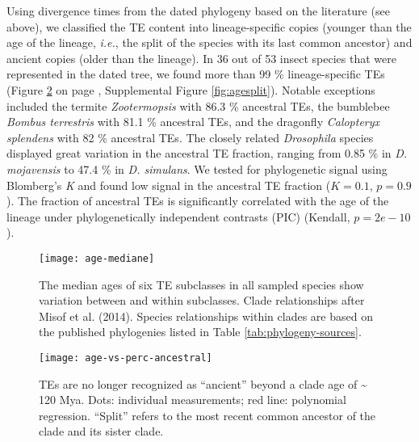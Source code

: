 Using divergence times from the dated phylogeny based on the literature
(see above), we classified the TE content into lineage-specific copies
(younger than the age of the lineage, \emph{i.e.}, the split of the
species with its last common ancestor) and ancient copies (older than
the lineage). In 36 out of 53 insect species that were represented in
the dated tree, we found more than 99 \% lineage-specific TEs (Figure
\ref{fig:age-vs-perc-ancestral} on page
\pageref{fig:age-vs-perc-ancestral},
Supplemental Figure \ref{fig:agesplit}). Notable exceptions included the termite
\emph{Zootermopsis} with 86.3 \% ancestral TEs, the bumblebee
\emph{Bombus terrestris} with 81.1 \% ancestral TEs, and the dragonfly
\emph{Calopteryx splendens} with 82 \% ancestral TEs. The closely
related \emph{Drosophila} species displayed great variation in the
ancestral TE fraction, ranging from 0.85 \% in \emph{D. mojavensis} to
47.4 \% in \emph{D. simulans}. We tested for phylogenetic signal using
Blomberg's \emph{K} and found low signal in the ancestral TE fraction
(\(K = 0.1\), \(p = 0.9\)). The fraction of ancestral TEs
is significantly correlated with the age of the lineage under
phylogenetically independent contrasts (PIC) (Kendall,
\(p = 2e-10\)).

\begin{figure}[h!]
\begin{center}
\texttt{[image: age-mediane]}
\caption[Median ages of transposable elements in arthropods]{{The median ages of six TE subclasses in all sampled species show
variation between and within subclasses. Clade relationships after Misof
et al. (2014). Species relationships within clades are based on the
published phylogenies listed in Table \ref{tab:phylogeny-sources}.
{\label{fig:age-mediane}}%
}}
\end{center}
\end{figure}

\begin{figure}[h!]
\begin{center}
\texttt{[image: age-vs-perc-ancestral]}
\caption[TEs are no longer recognized as ``ancient'' beyond a clade age of
\textasciitilde{} 120 Mya]{{TEs are no longer recognized as ``ancient'' beyond a clade age of
\textasciitilde{} 120 Mya. Dots: individual measurements; red line:
polynomial regression. ``Split'' refers to the most recent common
ancestor of the clade and its sister clade.
{\label{fig:age-vs-perc-ancestral}}%
}}
\end{center}
\end{figure}

